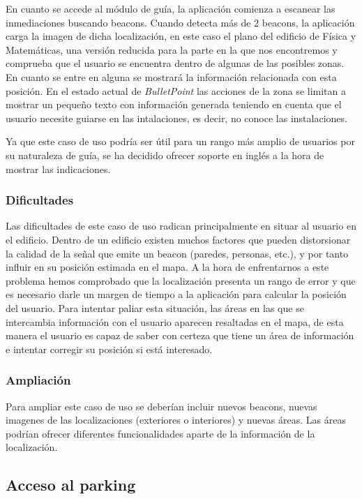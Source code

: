 En cuanto se accede al módulo de guía, la aplicación comienza a escanear las inmediaciones buscando beacons. Cuando detecta más de 2 beacons, la aplicación carga la imagen de dicha localización, en este caso el plano del edificio de Física y Matemáticas, una versión reducida para la parte en la que nos encontremos y comprueba que el usuario se encuentra dentro de algunas de las posibles zonas. En cuanto se entre en alguna se mostrará la información relacionada con esta posición. En el estado actual de \textit{BulletPoint} las acciones de la zona se limitan a mostrar un pequeño texto con información generada teniendo en cuenta que el usuario necesite guiarse en las intalaciones, es decir, no conoce las instalaciones.


Ya que este caso de uso podría ser útil para un rango más amplio de usuarios por su naturaleza de guía, se ha decidido ofrecer soporte en inglés a la hora de mostrar las indicaciones.

\subsubsection{Dificultades}

Las dificultades de este caso de uso radican principalmente en situar al usuario en el edificio. Dentro de un edificio existen muchos factores que pueden distorsionar la calidad de la señal que emite un beacon (paredes, personas, etc.), y por tanto influir en su posición estimada en el mapa. A la hora de enfrentarnos a este problema hemos comprobado que la localización presenta un rango de error y que es necesario darle un margen de tiempo a la aplicación para calcular la posición del usuario. Para intentar paliar esta situación, las áreas en las que se intercambia información con el usuario aparecen resaltadas en el mapa, de esta manera el usuario es capaz de saber con certeza que tiene un área de información e intentar corregir su posición si está interesado. 

\subsubsection{Ampliación}

Para ampliar este caso de uso se deberían incluir nuevos beacons, nuevas imagenes de las localizaciones (exteriores o interiores) y nuevas áreas. Las áreas podrían ofrecer diferentes funcionalidades aparte de la información de la localización.


\subsection{Acceso al parking}

